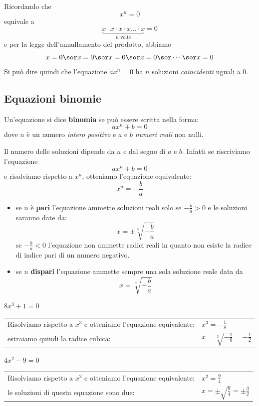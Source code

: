 Ricordando che \[x^n=0\]
equivale a \[\underbrace{x\cdot x\cdot x\cdot x \dots \cdot x}_{\text{\(n\) 
volte}}=0\]
e per la legge dell'annullamento del prodotto, abbiamo \[x=0 \sor x=0 
\sor x=0 \sor x=0 \sor \cdots \sor x=0 \]
Si può dire quindi che l'equazione \(ax^n=0\) ha \(n\) soluzioni 
\emph{coincidenti} uguali a 0.

\subsection{Equazioni binomie}

\begin{definizione}
Un'equazione si dice \textbf{binomia} se può essere scritta nella forma:
\[ax^n+b=0\]
dove \(n\) è un numero \emph{intero positivo} e \(a\) e \(b\)  \emph{numeri 
reali}  non nulli.  
\end{definizione}

Il numero delle soluzioni dipende da \(n\) e dal segno di \(a\) e \(b\).
Infatti se riscriviamo l'equazione
\[ax^n+b=0\]
e risolviamo rispetto a \(x^n\), otteniamo l'equazione equivalente:
\[x^n=-\frac{b}{a}\]

\begin{itemize}
\item se \(n\) è \textbf{pari} l'equazione ammette soluzioni reali 
solo se  \(-\frac{b}{a}>0\) e le soluzioni saranno date da:
\[x=\pm \sqrt[n]{-\frac{b}{a}}\]
se \(-\frac{b}{a}<0\) l'equazione non ammette radici reali in 
quanto non esiste la radice di indice pari di un numero negativo.
\item se \(n\) \textbf{dispari} l'equazione ammette sempre 
una sola soluzione reale data da  \[x= \sqrt[n]{-\frac{b}{a}}\] 
\end{itemize}

\begin{esempio}
\(8x^3+1=0\)
\begin{center}
\begin{tabular}{ll}
Risolviamo rispetto a \(x^3\) e otteniamo l'equazione equivalente: & 
\(x^3=-\frac{1}{8}\)\\
estraiamo quindi la radice cubica: & \(x=\sqrt[3]{-\frac{1}{8}} = -\frac{1}{2}\)
\end{tabular}
\end{center}
\end{esempio}

\begin{esempio}
\(4x^2-9=0\)
\begin{center}
\begin{tabular}{ll}
Risolviamo rispetto a \(x^2\) e otteniamo l'equazione equivalente: & 
\(x^2=\frac{9}{4}\)\\
le soluzioni di questa equazione sono due: & 
\(x=\pm \sqrt{\frac{9}{4}}=\pm\frac{3}{2}\)
\end{tabular}
\end{center}
\end{esempio}    


